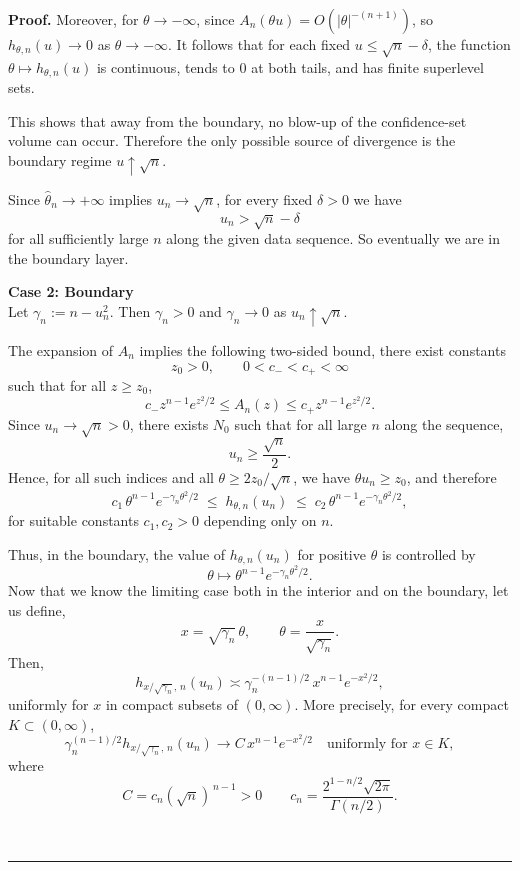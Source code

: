 \documentclass{article}%
\newenvironment{proof}[1][Proof]{\noindent\textbf{#1.} }{\ \rule{0.5em}{0.5em}}
\begin{document}
\begin{proof}
Moreover, for \(\theta\to-\infty\), since \(A_n(\theta u)=O(|\theta|^{-(n+1)})\), so \(h_{\theta,n}(u)\to0\) as \(\theta\to-\infty\). It follows that for each fixed \(u\le \sqrt n-\delta\), the function \(\theta\mapsto h_{\theta,n}(u)\) is continuous, tends to \(0\) at both tails, and has finite superlevel sets.

This shows that away from the boundary, no blow-up of the confidence-set volume can occur. Therefore the only possible source of divergence is the boundary regime \(u\uparrow\sqrt n\).

Since \(\hat\theta_n\to+\infty\) implies \(u_n\to\sqrt n\), for every fixed \(\delta>0\) we have
\[
u_n>\sqrt n-\delta
\]
for all sufficiently large \(n\) along the given data sequence. So eventually we are in the boundary layer.

\textbf{Case 2: Boundary}\\
Let $\gamma_n:=n-u_n^2$. Then \(\gamma_n>0\) and \(\gamma_n\to0\) as \(u_n\uparrow\sqrt n\).

The expansion of \(A_n\) implies the following two-sided bound, there exist constants
\[
z_0>0,\qquad 0<c_-<c_+<\infty
\]
such that for all \(z\ge z_0\),
\[
c_- z^{n-1}e^{z^2/2}\le A_n(z)\le c_+ z^{n-1}e^{z^2/2}.
\]
Since \(u_n\to\sqrt n>0\), there exists \(N_0\) such that for all large \(n\) along the sequence,
\[
u_n\ge \frac{\sqrt n}{2}.
\]
Hence, for all such indices and all \(\theta\ge 2z_0/\sqrt n\), we have \(\theta u_n\ge z_0\), and therefore
\begin{equation}\label{eq_sandwich}
c_1\, \theta^{n-1} e^{-\gamma_n\theta^2/2}
\;\le\;
h_{\theta,n}(u_n)
\;\le\;
c_2\, \theta^{n-1} e^{-\gamma_n\theta^2/2},
\end{equation}
for suitable constants \(c_1,c_2>0\) depending only on \(n\).

Thus, in the boundary, the value of \(h_{\theta,n}(u_n)\) for positive \(\theta\) is controlled by
\[
\theta\mapsto \theta^{n-1} e^{-\gamma_n\theta^2/2}.
\]
Now that we know the limiting case both in the interior and on the boundary, let us define,
\[
x=\sqrt{\gamma_n}\,\theta,
\qquad \theta=\frac{x}{\sqrt{\gamma_n}}.
\]
Then,
\[
h_{x/\sqrt{\gamma_n},\,n}(u_n)
\asymp
\gamma_n^{-(n-1)/2}\, x^{n-1}e^{-x^2/2},
\]
uniformly for \(x\) in compact subsets of \((0,\infty)\). More precisely, for every compact \(K\subset(0,\infty)\),
\begin{equation}\label{eq_unif}
\gamma_n^{(n-1)/2} h_{x/\sqrt{\gamma_n},\,n}(u_n)
\to
C\, x^{n-1}e^{-x^2/2}
\quad\text{uniformly for }x\in K,
\end{equation}
where
\[
C=c_n (\sqrt n)^{\,n-1}>0   \qquad  c_n = \frac{2^{1-n/2} \sqrt{2\pi}}{\Gamma(n/2)}.
\]


\end{proof}
\end{document}
